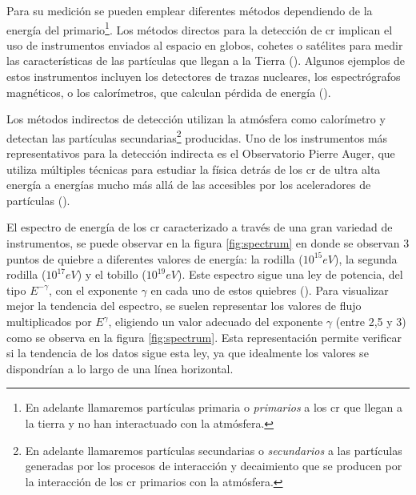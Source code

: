 Para su medición se pueden emplear diferentes métodos dependiendo de la energía del primario\footnote{En adelante llamaremos partículas primaria o \textit{primarios} a los \gls{cr} que llegan a la tierra y no han interactuado con la atmósfera.}. Los métodos directos para la detección de \gls{cr} implican el uso de instrumentos enviados al espacio en globos, cohetes o satélites para medir las características de las partículas que llegan a la Tierra (\cite{spurio_2015}). Algunos ejemplos de estos instrumentos incluyen los detectores de trazas nucleares, los espectrógrafos magnéticos, o los calorímetros, que calculan pérdida de energía (\cite{tomassetti_2023}).

Los métodos indirectos de detección utilizan la atmósfera como calorímetro y detectan las partículas secundarias\footnote{En adelante llamaremos partículas secundarias o \textit{secundarios} a las partículas generadas por los procesos de interacción y decaimiento que se producen por la interacción de los \gls{cr} primarios con la atmósfera.} producidas. Uno de los instrumentos más representativos para la detección indirecta es el Observatorio Pierre Auger, que utiliza múltiples técnicas para estudiar la física detrás de los \gls{cr} de ultra alta energía a energías mucho más allá de las accesibles por los aceleradores de partículas (\cite{engel_2021}).

El espectro de energía de los \gls{cr} caracterizado a través de una gran variedad de instrumentos, se puede observar en la figura \ref{fig:spectrum} en donde se observan 3 puntos de quiebre a diferentes valores de energía: la rodilla ($10^{15} eV$), la segunda rodilla ($10^{17}eV$) y el tobillo ($10^{19}eV$). Este espectro sigue una ley de potencia, del tipo $E^{-\gamma}$, con el exponente $\gamma$ en cada uno de estos quiebres (\cite{Riggi_2023}). Para visualizar mejor la tendencia del espectro, se suelen representar los valores de flujo multiplicados por $E^{\gamma}$, eligiendo un valor adecuado del exponente $\gamma$ (entre 2,5 y 3) como se observa en la figura \ref{fig:spectrum}. Esta representación permite verificar si la tendencia de los datos sigue esta ley, ya que idealmente los valores se dispondrían a lo largo de una línea horizontal.

